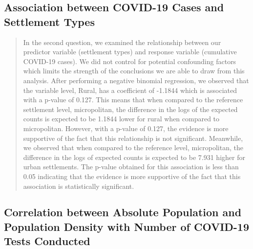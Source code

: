 \documentclass[
  12pt,
]{article}
\begin{document}
\hypertarget{association-between-covid-19-cases-and-settlement-types}{%
\subsection{Association between COVID-19 Cases and Settlement
Types}\label{association-between-covid-19-cases-and-settlement-types}}

\begin{quote}
In the second question, we examined the relationship between our
predictor variable (settlement types) and response variable (cumulative
COVID-19 cases). We did not control for potential confounding factors
which limits the strength of the conclusions we are able to draw from
this analysis. After performing a negative binomial regression, we
observed that the variable level, Rural, has a coefficient of -1.1844
which is associated with a p-value of 0.127. This means that when
compared to the reference settlement level, micropolitan, the difference
in the logs of the expected counts is expected to be 1.1844 lower for
rural when compared to micropolitan. However, with a p-value of 0.127,
the evidence is more supportive of the fact that this relationship is
not significant. Meanwhile, we observed that when compared to the
reference level, micropolitan, the difference in the logs of expected
counts is expected to be 7.931 higher for urban settlements. The p-value
obtained for this association is less than 0.05 indicating that the
evidence is more supportive of the fact that this association is
statistically significant.
\end{quote}

\hypertarget{correlation-between-absolute-population-and-population-density-with-number-of-covid-19-tests-conducted}{%
\subsection{Correlation between Absolute Population and Population
Density with Number of COVID-19 Tests
Conducted}\label{correlation-between-absolute-population-and-population-density-with-number-of-covid-19-tests-conducted}}
\end{document}
